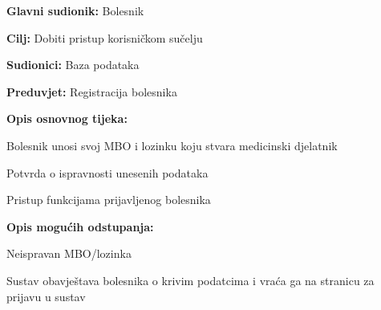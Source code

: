 				\noindent {}
				\begin{packed_item}
					
					\item \textbf{Glavni sudionik: }Bolesnik
					\item  \textbf{Cilj:} Dobiti pristup korisničkom sučelju
					\item  \textbf{Sudionici:} Baza podataka
					\item  \textbf{Preduvjet:} Registracija bolesnika
					\item  \textbf{Opis osnovnog tijeka:}
					
					
					\item[] \begin{packed_enum}
						
						\item Bolesnik unosi svoj MBO i lozinku koju stvara medicinski djelatnik
						\item Potvrda o ispravnosti unesenih podataka
						\item Pristup funkcijama prijavljenog bolesnika
					\end{packed_enum}
					
					\item  \textbf{Opis mogućih odstupanja:}
					
					\item[] \begin{packed_item}
						
						\item[2.a] Neispravan MBO/lozinka
						\item[] \begin{packed_enum}
							
							\item Sustav obavještava bolesnika o krivim podatcima i vraća ga na stranicu za prijavu u sustav
						
					
						\end{packed_enum}
						
						
					\end{packed_item}
				\end{packed_item}
			\pagebreak
			\noindent {}
